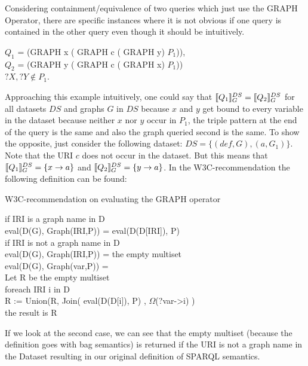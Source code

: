 			\noindent Considering containment/equivalence of two queries which just use the GRAPH
			Operator, there are specific instances where it is not obvious if one query is contained in the other query even though it should be intuitively.

			\begin{example}
				$Q_1$ = (GRAPH x ( GRAPH c ( GRAPH y) $P_1$)),\\ 
				$Q_2$ = (GRAPH y ( GRAPH c ( GRAPH x) $ P_1$))\\
				$?X,?Y \notin P_1$.
			\end{example}

			Approaching this example intuitively, one could say that $\llbracket Q_1
			\rrbracket^{DS}_{G} = \llbracket Q_2 \rrbracket^{DS}_G$ for all datasets $DS$ and graphs
			$G$ in $DS$ because $x$ and $y$ get bound to every variable in the dataset because neither
			$x$ nor $y$ occur in $P_1$, the triple pattern at the end
			of the query is the same and also the graph queried second is the same. 
			To show the opposite, just  consider the following dataset:
			$DS=\{(def,G), (a,G_1)\}$. Note that the URI $c$ does not occur in the dataset.
			But this means that $\llbracket Q_1 \rrbracket^{DS}_G = \{x \rightarrow a\}$ and  $\llbracket Q_2
			\rrbracket^{DS}_G = \{y \rightarrow a\}$.			
			In the W3C-recommendation\cite{w3standard} 
			the following definition can be found:

			\begin{algorithm}
				\caption{W3C-recommendation on evaluating the GRAPH operator}
			if IRI is a graph name in D\\
				\quad eval(D(G), Graph(IRI,P)) = eval(D(D[IRI]), P)\\
			if IRI is not a graph name in D\\
				\quad eval(D(G), Graph(IRI,P)) = the empty multiset\\
				\quad eval(D(G), Graph(var,P)) =\\
			Let R be the empty multiset\\
				\quad foreach IRI i in D\\
					\qquad R := Union(R, Join( eval(D(D[i]), P) , $\Omega$(?var->i) )\\
			the result is R
		\end{algorithm}

			If we look at the second case, we can see that the empty multiset (because the
			definition goes with bag semantics)
			is returned if the URI is not a graph name in the Dataset resulting
			in our original definition of SPARQL semantics. 
			
